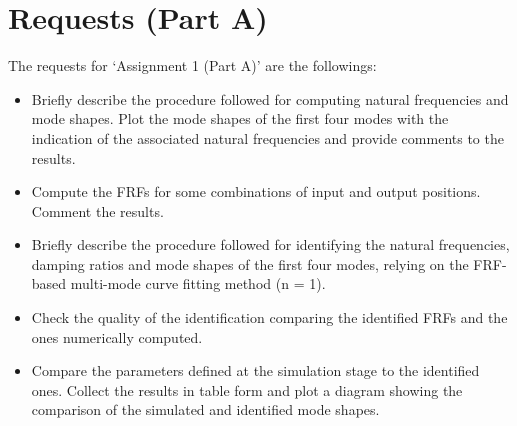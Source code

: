 \section{Requests (Part A)}
\label{sec:requests_part_A}

The requests for `Assignment 1 (Part A)' are the followings:

\begin{itemize}
    \item Briefly describe the procedure followed for computing natural frequencies and mode shapes. Plot the mode shapes of the first four modes with the indication of the associated natural frequencies and provide comments to the results.
    \item Compute the FRFs for some combinations of input and output positions. Comment the results.
    \item Briefly describe the procedure followed for identifying the natural frequencies, damping ratios and mode shapes of the first four modes, relying on the FRF-based multi-mode curve fitting method (n = 1).
    \item Check the quality of the identification comparing the identified FRFs and the ones numerically computed.
    \item Compare the parameters defined at the simulation stage to the identified ones. Collect the results in table form and plot a diagram showing the comparison of the simulated and identified mode shapes.
\end{itemize}
